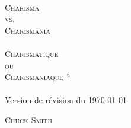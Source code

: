 
\pagestyle{empty}

\makeatletter
\begin{titlepage}
\begin{center}
\mbox{}
\vfill
\HRule \\[0.4cm]
\textsc{ \Huge %
    {Charisma\\ vs.\\[0.4cm] Charismania\\[0.4cm]\HRule\\[0.4cm]}{}
Charismatique\\ ou\\[0.4cm] Charismaniaque ?}\\[0.4cm]

\HRule \\[1.5cm]

%
   {\Large Version de r\'evision du \today}{}

\textsc{\Large Chuck Smith}\\[1.5cm]
\vfill
\mbox{}
\end{center}
\end{titlepage}
\makeatother

